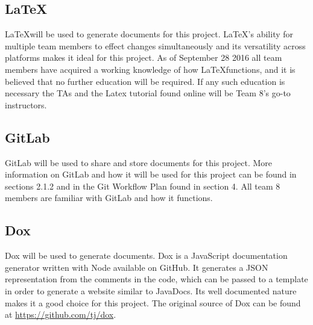 \documentclass{article}
\begin{document}

\subsection{\LaTeX}

\LaTeX will be used to generate documents for this project. \LaTeX's ability for 
multiple team members to effect changes simultaneously and its versatility 
across platforms makes it ideal for this project. As of September 28 2016 all 
team members have acquired a working knowledge of how \LaTeX functions, and it is 
believed that no further education will be required. If any such education is 
necessary the TAs and the Latex tutorial found online will be Team 8's go-to 
instructors. 

\subsection{GitLab}

GitLab will be used to share and store documents for this project. More 
information on GitLab and how it will be used for this project can be found in 
sections 2.1.2 and in the Git Workflow Plan found in section 4. All team 8 
members are familiar with GitLab and how it functions. 

\subsection{Dox}
Dox will be used to generate documents. Dox is a JavaScript documentation generator written with Node available on GitHub. It generates a JSON representation from the comments in the code, which can be passed to a template in order to generate a website similar to JavaDocs. Its well documented nature makes it a good choice for this project. The original source of Dox can be found at
\href{https://github.com/tj/dox}{https://github.com/tj/dox}.
\end{document}
